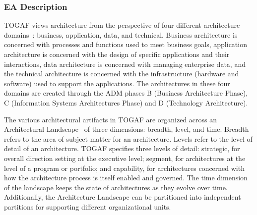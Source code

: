 \subsubsection{EA Description}
TOGAF views architecture from the perspective of four different architecture domains~\cite{sessions2007}: business, application, data, and technical. Business architecture is concerned with processes and functions used to meet business goals, application architecture is concerned with the design of specific applications and their interactions, data architecture is concerned with managing enterprise data, and the technical architecture is concerned with the infrastructure (hardware and software) used to support the applications. The architectures in these four domains are created through the ADM phases B (Business Architecture Phase), C (Information Systems Architectures Phase) and D (Technology Architecture).

The various architectural artifacts in TOGAF are organized across an Architectural Landscape~\cite{togaf9.1} of three dimensions: breadth, level, and time. Breadth refers to the area of subject matter for an architecture. Levels refer to the level of detail of an architecture. TOGAF specifies three levels of detail: strategic, for overall direction setting at the executive level; segment, for architectures at the level of a program or portfolio; and capability, for architectures concerned with how the architecture process is itself enabled and governed. The time dimension of the landscape keeps the state of architectures as they evolve over time. Additionally, the Architecture Landscape can be partitioned into independent partitions for supporting different organizational units. 




